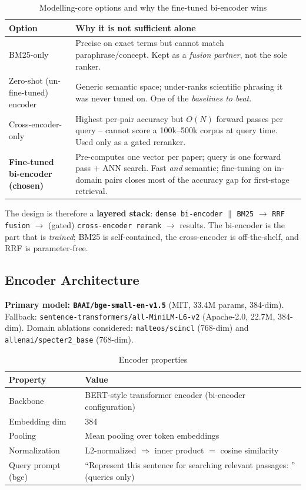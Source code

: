 \documentclass[12pt,a4paper]{article}
\begin{document}
\begin{table}[H]
\centering
\caption{Modelling-core options and why the fine-tuned bi-encoder wins}
\small
\begin{tabularx}{\linewidth}{@{} l L @{}}
\toprule
\textbf{Option} & \textbf{Why it is not sufficient alone} \\
\midrule
BM25-only & Precise on exact terms but cannot match paraphrase/concept. Kept as a \emph{fusion partner}, not the sole ranker. \\
Zero-shot (un-fine-tuned) encoder & Generic semantic space; under-ranks scientific phrasing it was never tuned on. One of the \emph{baselines to beat}. \\
Cross-encoder-only & Highest per-pair accuracy but $O(N)$ forward passes per query -- cannot score a 100k--500k corpus at query time. Used only as a gated reranker. \\
\textbf{Fine-tuned bi-encoder (chosen)} & Pre-computes one vector per paper; query is one forward pass + ANN search. Fast \emph{and} semantic; fine-tuning on in-domain pairs closes most of the accuracy gap for first-stage retrieval. \\
\bottomrule
\end{tabularx}
\end{table}

The design is therefore a \textbf{layered stack}: \texttt{dense bi-encoder} $\parallel$ \texttt{BM25} $\rightarrow$ \texttt{RRF fusion} $\rightarrow$ (gated) \texttt{cross-encoder rerank} $\rightarrow$ results. The bi-encoder is the part that is \emph{trained}; BM25 is self-contained, the cross-encoder is off-the-shelf, and RRF is parameter-free.

\subsection{Encoder Architecture}

\textbf{Primary model: \texttt{BAAI/bge-small-en-v1.5}} (MIT, 33.4M params, 384-dim). Fallback: \texttt{sentence-transformers/all-MiniLM-L6-v2} (Apache-2.0, 22.7M, 384-dim). Domain ablations considered: \texttt{malteos/scincl} (768-dim) and \texttt{allenai/specter2\_base} (768-dim).

\begin{table}[H]
\centering
\caption{Encoder properties}
\begin{tabular}{ll}
\toprule
\textbf{Property} & \textbf{Value} \\
\midrule
Backbone & BERT-style transformer encoder (bi-encoder configuration) \\
Embedding dim & 384 \\
Pooling & Mean pooling over token embeddings \\
Normalization & L2-normalized $\Rightarrow$ inner product $=$ cosine similarity \\
Query prompt (bge) & ``Represent this sentence for searching relevant passages: '' (queries only) \\
\bottomrule
\end{tabular}
\end{table}
\end{document}

